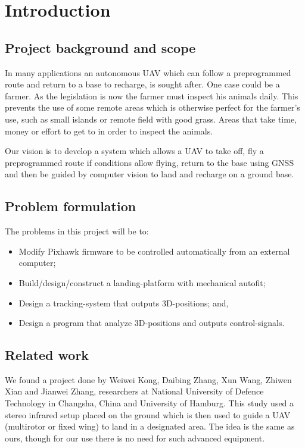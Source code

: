 \section{Introduction}
\subsection{Project background and scope}
In many applications an autonomous UAV which can follow a preprogrammed route and return to a base to recharge, is sought after. One case could be a farmer. As the legislation is now the farmer must inspect his animals daily. This prevents the use of some remote areas which is otherwise perfect for the farmer’s use, such as small islands or remote field with good grass. Areas that take time, money or effort to get to in order to inspect the animals.

Our vision is to develop a system which allows a UAV to take off, fly a preprogrammed route if conditions allow flying, return to the base using GNSS and then be guided by computer vision to land and recharge on a ground base.

\subsection{Problem formulation}
The problems in this project will be to:

\begin{itemize}
	\item Modify Pixhawk firmware to be controlled automatically from an external computer;
	\item Build/design/construct a landing-platform with mechanical autofit;
	\item Design a tracking-system that outputs 3D-positions; and,
	\item Design a program that analyze 3D-positions and outputs control-signals.
\end{itemize}

\subsection{Related work}
We found a project done by Weiwei Kong, Daibing Zhang, Xun Wang, Zhiwen Xian and Jianwei Zhang, researchers at National University of Defence Technology in Changsha, China and University of Hamburg. This study used a stereo infrared setup placed on the ground which is then used to guide a UAV (multirotor or fixed wing) to land in a designated area. The idea is the same as ours, though for our use there is no need for such advanced equipment. 

